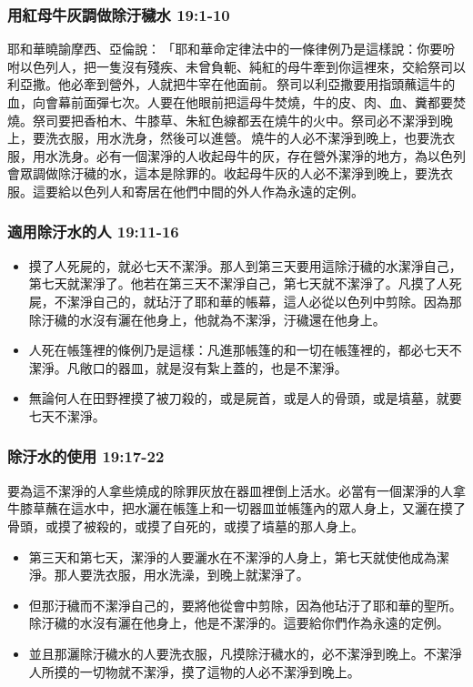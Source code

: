 \subsubsection{用紅母牛灰調做除汙穢水 19:1-10}
\noindent
耶和華曉諭摩西、亞倫說： 「耶和華命定律法中的一條律例乃是這樣說：你要吩咐以色列人，把一隻沒有殘疾、未曾負軛、純紅的母牛牽到你這裡來，交給祭司以利亞撒。他必牽到營外，人就把牛宰在他面前。 祭司以利亞撒要用指頭蘸這牛的血，向會幕前面彈七次。人要在他眼前把這母牛焚燒，牛的皮、肉、血、糞都要焚燒。祭司要把香柏木、牛膝草、朱紅色線都丟在燒牛的火中。祭司必不潔淨到晚上，要洗衣服，用水洗身，然後可以進營。 燒牛的人必不潔淨到晚上，也要洗衣服，用水洗身。必有一個潔淨的人收起母牛的灰，存在營外潔淨的地方，為以色列會眾調做除汙穢的水，這本是除罪的。收起母牛灰的人必不潔淨到晚上，要洗衣服。這要給以色列人和寄居在他們中間的外人作為永遠的定例。 

\subsubsection{適用除汙水的人 19:11-16}
\begin{itemize} 
\itemsep-.25em  
\item 摸了人死屍的，就必七天不潔淨。那人到第三天要用這除汙穢的水潔淨自己，第七天就潔淨了。他若在第三天不潔淨自己，第七天就不潔淨了。凡摸了人死屍，不潔淨自己的，就玷汙了耶和華的帳幕，這人必從以色列中剪除。因為那除汙穢的水沒有灑在他身上，他就為不潔淨，汙穢還在他身上。
\item 人死在帳篷裡的條例乃是這樣：凡進那帳篷的和一切在帳篷裡的，都必七天不潔淨。凡敞口的器皿，就是沒有紮上蓋的，也是不潔淨。
\item 無論何人在田野裡摸了被刀殺的，或是屍首，或是人的骨頭，或是墳墓，就要七天不潔淨。
\end{itemize}

\subsubsection{除汙水的使用 19:17-22}
要為這不潔淨的人拿些燒成的除罪灰放在器皿裡倒上活水。必當有一個潔淨的人拿牛膝草蘸在這水中，把水灑在帳篷上和一切器皿並帳篷內的眾人身上，又灑在摸了骨頭，或摸了被殺的，或摸了自死的，或摸了墳墓的那人身上。
\vspace*{-2mm}
\begin{itemize} 
\itemsep-.25em  
\item 第三天和第七天，潔淨的人要灑水在不潔淨的人身上，第七天就使他成為潔淨。那人要洗衣服，用水洗澡，到晚上就潔淨了。
\item 但那汙穢而不潔淨自己的，要將他從會中剪除，因為他玷汙了耶和華的聖所。除汙穢的水沒有灑在他身上，他是不潔淨的。這要給你們作為永遠的定例。
\item 並且那灑除汙穢水的人要洗衣服，凡摸除汙穢水的，必不潔淨到晚上。不潔淨人所摸的一切物就不潔淨，摸了這物的人必不潔淨到晚上。
\end{itemize}

